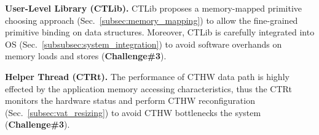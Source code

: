 


\noindent \textbf{User-Level Library (CTLib). } CTLib proposes a memory-mapped primitive choosing approach (Sec.~\ref{subsec:memory_mapping}) to allow the fine-grained primitive binding on data structures. Moreover, CTLib is carefully integrated into OS (Sec.~\ref{subsubsec:system_integration}) to avoid software overhands on memory loads and stores (\textbf{Challenge\#3}). 




\noindent \textbf{Helper Thread (CTRt). }The performance of CTHW data path is highly effected by the application memory accessing characteristics, thus the CTRt monitors the hardware status and perform CTHW reconfiguration (Sec.~\ref{subsec:vat_resizing}) to avoid CTHW bottlenecks the system (\textbf{Challenge\#3}). 

